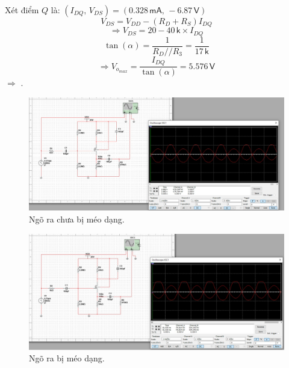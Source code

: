 
Xét điểm $Q$ là: $\left( I_{DQ}\textsf{, } V_{DS}\right) = \left( 0.328\,\textsf{mA, } -6.87\,\textsf{V}\right)$
\[ V_{DS} = V_{DD} - \left( R_{D} + R_{S} \right) I_{DQ}\]
\[ \Rightarrow V_{DS} = 20 - 40\,\textsf{k}\times I_{DQ}\]
\[ \tan (\alpha) = \dfrac{1}{R_{D} // R_{3}} = \dfrac{1}{17\,\textsf{k}}\]
\[ \Rightarrow V_{o_{max}} = \dfrac{I_{DQ}}{\tan(\alpha)} = 5.576\,\textsf{V}\]
$\Rightarrow$ .


\begin{figure}[H]
	\centering
	\includegraphics[width=\linewidth]{./my-chapters/my-images/Question1/c_3.jpg}
	\caption{Ngõ ra chưa bị méo dạng.}
\end{figure}
\begin{figure}[H]
	\centering
	\includegraphics[width=\linewidth]{./my-chapters/my-images/Question1/c_4.jpg}
	\caption{Ngõ ra bị méo dạng.}
\end{figure}

